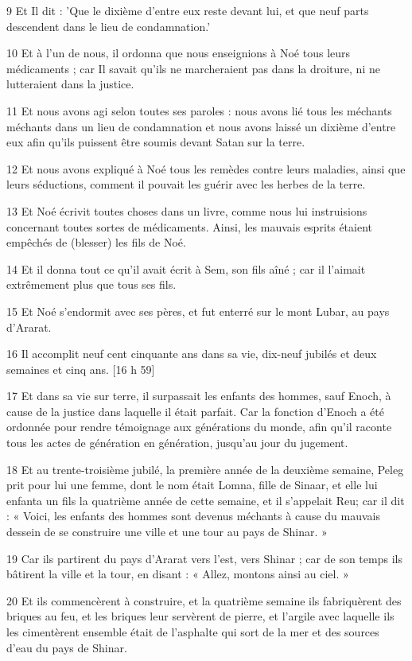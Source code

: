 \par 9 Et Il dit : 'Que le dixième d'entre eux reste devant lui, et que neuf parts descendent dans le lieu de condamnation.'
\par 10 Et à l'un de nous, il ordonna que nous enseignions à Noé tous leurs médicaments ; car Il savait qu’ils ne marcheraient pas dans la droiture, ni ne lutteraient dans la justice.
\par 11 Et nous avons agi selon toutes ses paroles : nous avons lié tous les méchants méchants dans un lieu de condamnation et nous avons laissé un dixième d'entre eux afin qu'ils puissent être soumis devant Satan sur la terre.
\par 12 Et nous avons expliqué à Noé tous les remèdes contre leurs maladies, ainsi que leurs séductions, comment il pouvait les guérir avec les herbes de la terre.
\par 13 Et Noé écrivit toutes choses dans un livre, comme nous lui instruisions concernant toutes sortes de médicaments. Ainsi, les mauvais esprits étaient empêchés de (blesser) les fils de Noé.
\par 14 Et il donna tout ce qu'il avait écrit à Sem, son fils aîné ; car il l'aimait extrêmement plus que tous ses fils.
\par 15 Et Noé s'endormit avec ses pères, et fut enterré sur le mont Lubar, au pays d'Ararat.
\par 16 Il accomplit neuf cent cinquante ans dans sa vie, dix-neuf jubilés et deux semaines et cinq ans. [16 h 59]
\par 17 Et dans sa vie sur terre, il surpassait les enfants des hommes, sauf Enoch, à cause de la justice dans laquelle il était parfait. Car la fonction d'Enoch a été ordonnée pour rendre témoignage aux générations du monde, afin qu'il raconte tous les actes de génération en génération, jusqu'au jour du jugement.
\par 18 Et au trente-troisième jubilé, la première année de la deuxième semaine, Peleg prit pour lui une femme, dont le nom était Lomna, fille de Sinaar, et elle lui enfanta un fils la quatrième année de cette semaine, et il s'appelait Reu; car il dit : « Voici, les enfants des hommes sont devenus méchants à cause du mauvais dessein de se construire une ville et une tour au pays de Shinar. »
\par 19 Car ils partirent du pays d'Ararat vers l'est, vers Shinar ; car de son temps ils bâtirent la ville et la tour, en disant : « Allez, montons ainsi au ciel. »
\par 20 Et ils commencèrent à construire, et la quatrième semaine ils fabriquèrent des briques au feu, et les briques leur servèrent de pierre, et l'argile avec laquelle ils les cimentèrent ensemble était de l'asphalte qui sort de la mer et des sources d'eau du pays de Shinar.
